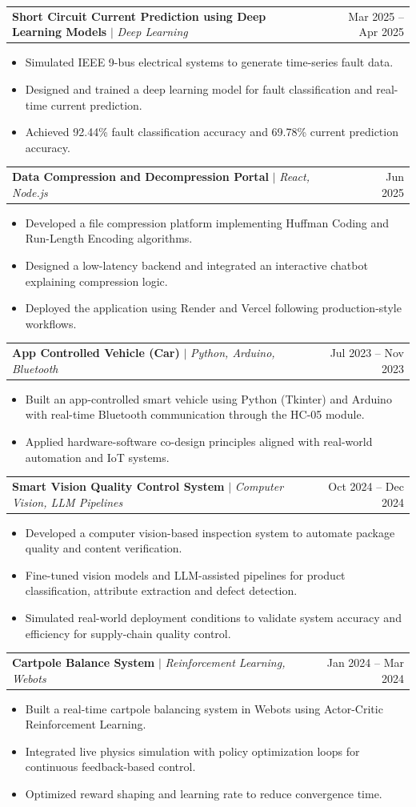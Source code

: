 \documentclass[letterpaper,11pt]{article}
\makeatletter
\newcommand{\resumeItem}[1]{\item\small{{#1 \vspace{-2pt}}}}
\newcommand{\resumeProjectHeading}[2]{
\item
\begin{tabular*}{0.97\textwidth}{l@{\extracolsep{\fill}}r}
\small#1 & #2 \\
\end{tabular*}\vspace{-7pt}
}
\newcommand{\resumeItemListStart}{\begin{itemize}}
\newcommand{\resumeItemListEnd}{\end{itemize}\vspace{-5pt}}
\makeatother
\begin{document}
\resumeProjectHeading
{\textbf{Short Circuit Current Prediction using Deep Learning Models}
$|$
\emph{Deep Learning}}
{Mar 2025 -- Apr 2025}

\resumeItemListStart
\resumeItem{Simulated IEEE 9-bus electrical systems to generate time-series fault data.}
\resumeItem{Designed and trained a deep learning model for fault classification and real-time current prediction.}
\resumeItem{Achieved 92.44\% fault classification accuracy and 69.78\% current prediction accuracy.}
\resumeItemListEnd

\resumeProjectHeading
{\textbf{Data Compression and Decompression Portal}
$|$
\emph{React, Node.js}}
{Jun 2025}

\resumeItemListStart
\resumeItem{Developed a file compression platform implementing Huffman Coding and Run-Length Encoding algorithms.}
\resumeItem{Designed a low-latency backend and integrated an interactive chatbot explaining compression logic.}
\resumeItem{Deployed the application using Render and Vercel following production-style workflows.}
\resumeItemListEnd

\resumeProjectHeading
{\textbf{App Controlled Vehicle (Car)}
$|$
\emph{Python, Arduino, Bluetooth}}
{Jul 2023 -- Nov 2023}

\resumeItemListStart
\resumeItem{Built an app-controlled smart vehicle using Python (Tkinter) and Arduino with real-time Bluetooth communication through the HC-05 module.}
\resumeItem{Applied hardware-software co-design principles aligned with real-world automation and IoT systems.}
\resumeItemListEnd

\resumeProjectHeading
{\textbf{Smart Vision Quality Control System}
$|$
\emph{Computer Vision, LLM Pipelines}}
{Oct 2024 -- Dec 2024}

\resumeItemListStart
\resumeItem{Developed a computer vision-based inspection system to automate package quality and content verification.}
\resumeItem{Fine-tuned vision models and LLM-assisted pipelines for product classification, attribute extraction and defect detection.}
\resumeItem{Simulated real-world deployment conditions to validate system accuracy and efficiency for supply-chain quality control.}
\resumeItemListEnd

\resumeProjectHeading
{\textbf{Cartpole Balance System}
$|$
\emph{Reinforcement Learning, Webots}}
{Jan 2024 -- Mar 2024}

\resumeItemListStart
\resumeItem{Built a real-time cartpole balancing system in Webots using Actor-Critic Reinforcement Learning.}
\resumeItem{Integrated live physics simulation with policy optimization loops for continuous feedback-based control.}
\resumeItem{Optimized reward shaping and learning rate to reduce convergence time.}
\resumeItemListEnd
\end{document}
